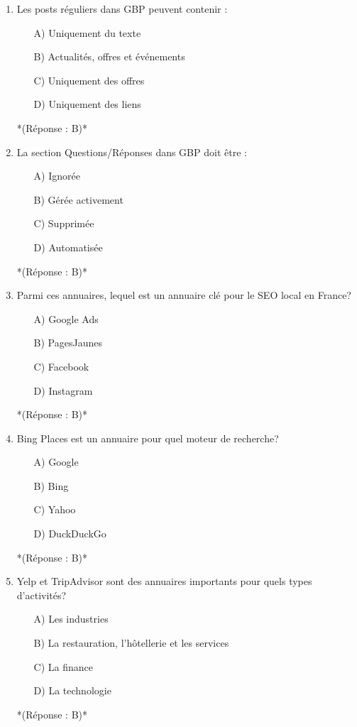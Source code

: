 \documentclass[12pt,a4paper,twoside]{report}
\begin{document}
\begin{enumerate}
\item Les posts réguliers dans GBP peuvent contenir :
\begin{itemize}
\item[A)] Uniquement du texte
\item[B)] Actualités, offres et événements
\item[C)] Uniquement des offres
\item[D)] Uniquement des liens
\end{itemize}
*(Réponse : B)*

\item La section Questions/Réponses dans GBP doit être :
\begin{itemize}
\item[A)] Ignorée
\item[B)] Gérée activement
\item[C)] Supprimée
\item[D)] Automatisée
\end{itemize}
*(Réponse : B)*

\item Parmi ces annuaires, lequel est un annuaire clé pour le SEO local en France?
\begin{itemize}
\item[A)] Google Ads
\item[B)] PagesJaunes
\item[C)] Facebook
\item[D)] Instagram
\end{itemize}
*(Réponse : B)*

\item Bing Places est un annuaire pour quel moteur de recherche?
\begin{itemize}
\item[A)] Google
\item[B)] Bing
\item[C)] Yahoo
\item[D)] DuckDuckGo
\end{itemize}
*(Réponse : B)*

\item Yelp et TripAdvisor sont des annuaires importants pour quels types d'activités?
\begin{itemize}
\item[A)] Les industries
\item[B)] La restauration, l'hôtellerie et les services
\item[C)] La finance
\item[D)] La technologie
\end{itemize}
*(Réponse : B)*


\end{enumerate}
\end{document}
